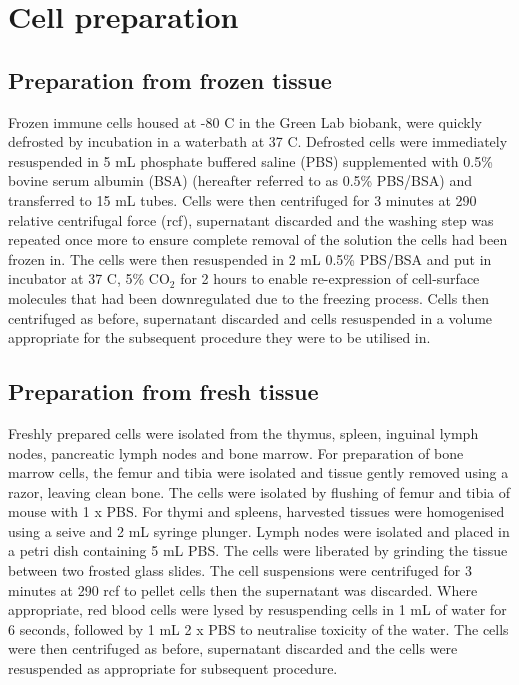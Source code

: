 \section{Cell preparation}
\label{sec:cellprep}

\subsection{Preparation from frozen tissue}

Frozen immune cells housed at -80 \textdegree C in the Green Lab biobank, were quickly defrosted by incubation in a waterbath at 37 \textdegree C.
Defrosted cells were immediately resuspended in 5 mL phosphate buffered saline (PBS) supplemented with 0.5\% bovine serum albumin (BSA) (hereafter referred to as 0.5\% PBS/BSA) and transferred to 15 mL tubes.
Cells were then centrifuged for 3 minutes at 290 relative centrifugal force (rcf), supernatant discarded and the washing step was repeated once more to ensure complete removal of the solution the cells had been frozen in.
The cells were then resuspended in 2 mL 0.5\% PBS/BSA and put in incubator at 37 \textdegree C, 5\% CO$_2$ for 2 hours to enable re-expression of cell-surface molecules that had been downregulated due to the freezing process.
Cells then centrifuged as before, supernatant discarded and cells resuspended in a volume appropriate for the subsequent procedure they were to be utilised in.

\subsection{Preparation from fresh tissue}
Freshly prepared cells were isolated from the thymus, spleen, inguinal lymph nodes, pancreatic lymph nodes and bone marrow.
For preparation of bone marrow cells, the femur and tibia were isolated and tissue gently removed using a razor, leaving clean bone.
The cells were isolated by flushing of femur and tibia of mouse with 1 x PBS.
For thymi and spleens, harvested tissues were homogenised using a seive and 2 mL syringe plunger.
Lymph nodes were isolated and placed in a petri dish containing 5 mL PBS.
The cells were liberated by grinding the tissue between two frosted glass slides.
The cell suspensions were centrifuged for 3 minutes at 290 rcf to pellet cells then the supernatant was discarded.
Where appropriate, red blood cells were lysed by resuspending cells in 1 mL of water for 6 seconds, followed by 1 mL 2 x PBS to neutralise toxicity of the water.
The cells were then centrifuged as before, supernatant discarded and the cells were resuspended as appropriate for subsequent procedure.

